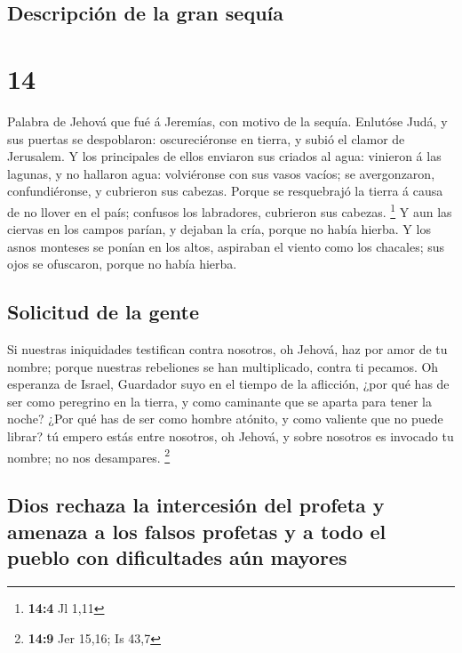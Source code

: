\hypertarget{descripciuxf3n-de-la-gran-sequuxeda}{%
\subsection{Descripción de la gran
sequía}\label{descripciuxf3n-de-la-gran-sequuxeda}}

\hypertarget{section-13}{%
\section{14}\label{section-13}}

 Palabra de Jehová que fué á Jeremías, con motivo de la
sequía.  Enlutóse Judá, y sus puertas se despoblaron:
oscureciéronse en tierra, y subió el clamor de Jerusalem.  Y
los principales de ellos enviaron sus criados al agua: vinieron á las
lagunas, y no hallaron agua: volviéronse con sus vasos vacíos; se
avergonzaron, confundiéronse, y cubrieron sus cabezas. 
Porque se resquebrajó la tierra á causa de no llover en el país;
confusos los labradores, cubrieron sus cabezas. \footnote{\textbf{14:4}
  Jl 1,11}  Y aun las ciervas en los campos parían, y
dejaban la cría, porque no había hierba.  Y los asnos
monteses se ponían en los altos, aspiraban el viento como los chacales;
sus ojos se ofuscaron, porque no había hierba.

\hypertarget{solicitud-de-la-gente}{%
\subsection{Solicitud de la gente}\label{solicitud-de-la-gente}}

 Si nuestras iniquidades testifican contra nosotros, oh
Jehová, haz por amor de tu nombre; porque nuestras rebeliones se han
multiplicado, contra ti pecamos.  Oh esperanza de Israel,
Guardador suyo en el tiempo de la aflicción, ¿por qué has de ser como
peregrino en la tierra, y como caminante que se aparta para tener la
noche?  ¿Por qué has de ser como hombre atónito, y como
valiente que no puede librar? tú empero estás entre nosotros, oh Jehová,
y sobre nosotros es invocado tu nombre; no nos desampares. \footnote{\textbf{14:9}
  Jer 15,16; Is 43,7}

\hypertarget{dios-rechaza-la-intercesiuxf3n-del-profeta-y-amenaza-a-los-falsos-profetas-y-a-todo-el-pueblo-con-dificultades-auxfan-mayores}{%
\subsection{Dios rechaza la intercesión del profeta y amenaza a los
falsos profetas y a todo el pueblo con dificultades aún
mayores}\label{dios-rechaza-la-intercesiuxf3n-del-profeta-y-amenaza-a-los-falsos-profetas-y-a-todo-el-pueblo-con-dificultades-auxfan-mayores}}

